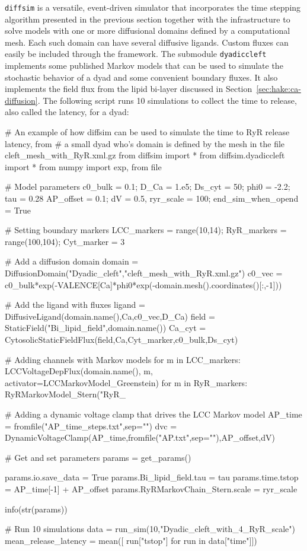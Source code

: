 \texttt{diffsim} is a versatile, event-driven simulator that
incorporates the time stepping algorithm presented in the previous
section together with the infrastructure to solve models with one or
more diffusional domains defined by a computational mesh. Each such
domain can have several diffusive ligands. Custom fluxes can easily be
included through the framework. The submodule \texttt{dyadiccleft}
implements some published Markov models that can be used to simulate
the stochastic behavior of a dyad and some convenient boundary
fluxes. It also implements the field flux from the lipid bi-layer
discussed in Section~\ref{sec:hake:ca-diffusion}. The following script
runs 10 simulations to collect the time to release, also called the
latency, for a dyad:
\begin{python}
# An example of how diffsim can be used to simulate the time to RyR release latency, from
# a small dyad who's domain is defined by the mesh in the file cleft_mesh_with_RyR.xml.gz
from diffsim import *
from diffsim.dyadiccleft import *
from numpy import exp, from file

# Model parameters
c0_bulk = 0.1; D_Ca = 1.e5; Ds_cyt = 50; phi0 = -2.2; tau = 0.28
AP_offset = 0.1; dV = 0.5, ryr_scale = 100; end_sim_when_opend = True

# Setting boundary markers
LCC_markers = range(10,14); RyR_markers = range(100,104); Cyt_marker = 3

# Add a diffusion domain
domain = DiffusionDomain("Dyadic_cleft","cleft_mesh_with_RyR.xml.gz")
c0_vec = c0_bulk*exp(-VALENCE[Ca]*phi0*exp(-domain.mesh().coordinates()[:,-1]))

# Add the ligand with fluxes
ligand = DiffusiveLigand(domain.name(),Ca,c0_vec,D_Ca)
field  = StaticField("Bi_lipid_field",domain.name())
Ca_cyt = CytosolicStaticFieldFlux(field,Ca,Cyt_marker,c0_bulk,Ds_cyt)

# Adding channels with Markov models
for m in LCC_markers:
    LCCVoltageDepFlux(domain.name(), m, activator=LCCMarkovModel_Greenstein)
for m in RyR_markers:
    RyRMarkovModel_Stern("RyR_%

# Adding a dynamic voltage clamp that drives the LCC Markov model
AP_time = fromfile("AP_time_steps.txt",sep="\n")
dvc = DynamicVoltageClamp(AP_time,fromfile("AP.txt",sep="\n"),AP_offset,dV)

# Get and set parameters
params = get_params()

params.io.save_data = True
params.Bi_lipid_field.tau = tau
params.time.tstop = AP_time[-1] + AP_offset
params.RyRMarkovChain_Stern.scale = ryr_scale

info(str(params))

# Run 10  simulations
data = run_sim(10,"Dyadic_cleft_with_4_RyR_scale")
mean_release_latency = mean([ run["tstop"] for run in data["time"]])
\end{python}
